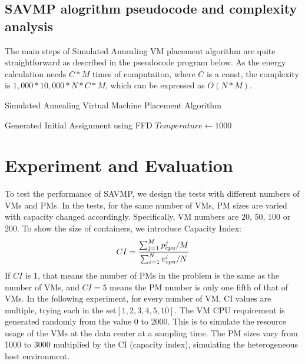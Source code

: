 \documentclass[10pt, conference, compsocconf]{IEEEtran}
\begin{document}
\subsection{SAVMP alogrithm pseudocode and complexity analysis }

The main steps of Simulated Annealing VM placement algorithm are quite
straightforward as described in the pseudocode program below. As the energy
calculation needs $C*M$ times of computaiton, where $C$ is a const, the
complexity is $1,000*10,000*N*C*M$, which can be expressed as $O(N*M)$.

\begin{algorithm}
\SetAlgoLined
\LinesNumbered
\caption{Simulated Annealing Virtual Machine Placement Algorithm}
	Generated Initial Assignment using FFD\; 
	$Temperature\leftarrow 1000$ \;
\end{algorithm}


\section{Experiment and Evaluation}

To test the performance of SAVMP, we design the tests with different numbers of
VMs and PMs. In the tests, for the same number of VMs, PM sizes are varied with
capacity changed accordingly. Specifically, VM numbers are 20, 50, 100 or 200.
To show the size of containers, we introduce Capacity Index:\\
\begin{equation}\label{12}
CI=\frac{\sum_{j=1}^Mp_{cpu}^j / M}{\sum_{i=1}^Nv_{cpu}^i / N} \\
\end{equation} 
If $CI$ is 1, that means the number of PMs in the problem is the same as the
number of VMs, and $CI=5$ means the PM number is only one fifth of that of VMs. In the
following experiment, for every number of VM, CI values are multiple, trying
each in the set$ [1, 2, 3, 4, 5, 10]$.
The VM CPU requirement is generated randomly from the value 0 to 2000. This is
to simulate the resource usage of the VMs at the data center at a sampling time.
The PM sizes vary from 1000 to 3000 multiplied by the CI (capacity index),
simulating the heterogeneous host environment.
\end{document}
